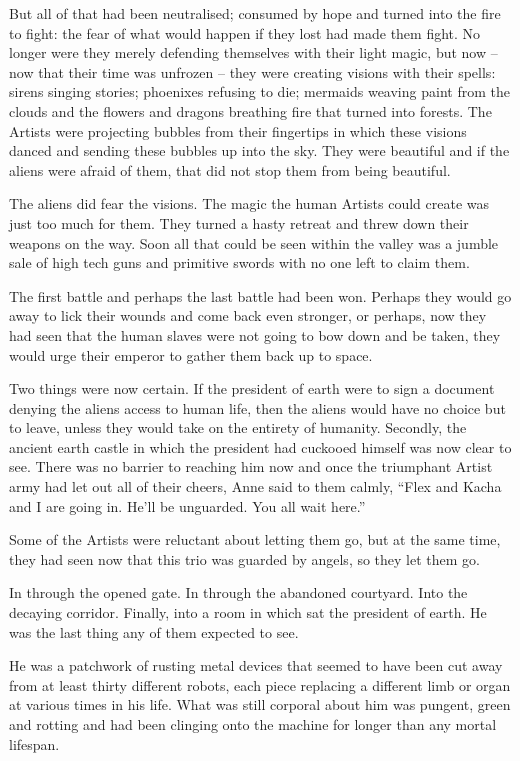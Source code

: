 But all of that had been neutralised; consumed by hope and turned into
the fire to fight: the fear of what would happen if they lost had made
them fight. No longer were they merely defending themselves with their
light magic, but now – now that their time was unfrozen – they were
creating visions with their spells: sirens singing stories; phoenixes
refusing to die; mermaids weaving paint from the clouds and the
flowers and dragons breathing fire that turned into forests. The
Artists were projecting bubbles from their fingertips in which these
visions danced and sending these bubbles up into the sky. They were
beautiful and if the aliens were afraid of them, that did not stop
them from being beautiful.

The aliens did fear the visions. The magic the human Artists could
create was just too much for them. They turned a hasty retreat and
threw down their weapons on the way. Soon all that could be seen
within the valley was a jumble sale of high tech guns and primitive
swords with no one left to claim them.

The first battle and perhaps the last battle had been won. Perhaps
they would go away to lick their wounds and come back even stronger,
or perhaps, now they had seen that the human slaves were not going to
bow down and be taken, they would urge their emperor to gather them
back up to space.

Two things were now certain. If the president of earth were to sign a
document denying the aliens access to human life, then the aliens
would have no choice but to leave, unless they would take on the
entirety of humanity. Secondly, the ancient earth castle in which the
president had cuckooed himself was now clear to see. There was no
barrier to reaching him now and once the triumphant Artist army had
let out all of their cheers, Anne said to them calmly, “Flex and Kacha
and I are going in. He’ll be unguarded. You all wait here.”

Some of the Artists were reluctant about letting them go, but at the
same time, they had seen now that this trio was guarded by angels, so
they let them go.

In through the opened gate. In through the abandoned courtyard. Into
the decaying corridor. Finally, into a room in which sat the president
of earth. He was the last thing any of them expected to see.

He was a patchwork of rusting metal devices that seemed to have been
cut away from at least thirty different robots, each piece replacing a
different limb or organ at various times in his life. What was still
corporal about him was pungent, green and rotting and had been
clinging onto the machine for longer than any mortal lifespan.

